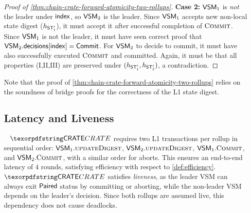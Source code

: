 \begin{proof}[Proof of \cref{thm:chain-crate-forward-atomicity-two-rollups}]
    \noindent\textbf{Case 2:} $\mathsf{VSM}_{1}$ is \emph{not} the leader under $\mathsf{index}$, so $\mathsf{VSM}_{2}$ is the leader. Since $\mathsf{VSM}_{1}$ accepts new non-local state digest ($h_{\mathsf{ST_{1}'}}$), it must accept it after successful completion of $\textproc{Commit}$. Since $\mathsf{VSM}_{1}$ is not the leader, it must have seen correct proof that $\mathsf{VSM}_{2}.\mathsf{decisions}[\mathsf{index}] = \mathsf{Commit}$. For $\mathsf{VSM}_{2}$ to decide to commit, it must have also successfully executed $\textproc{Commit}$ and committed. Again, it must be that all properties (I,II,III) are preserved under $(h_{\mathsf{ST_{1}'}}, h_{\mathsf{ST_{2}'}})$, a contradiction.  

\end{proof}

Note that the proof of \cref{thm:chain-crate-forward-atomicity-two-rollups} relies on the soundness of bridge proofs for the correctness of the L1 state digest.


\subsection{Latency and Liveness}~\label{sec:liveness-chain-crt}
$\pname$ requires two L1 transactions per rollup in sequential order: $\vsm{1}.\textproc{updateDigest}$, $\vsm{2}.\textproc{updateDigest}$, $\vsm{1}.\textproc{Commit}$, and $\vsm{2}.\textproc{Commit}$, with a similar order for aborts. This ensures an end-to-end latency of $4$ rounds, satisfying efficiency with respect to \cref{def:efficiency}. $\pname$ satisfies \emph{liveness}, as the leader VSM can always exit $\mathsf{Paired}$ status by committing or aborting, while the non-leader VSM depends on the leader’s decision. Since both rollups are assumed live, this dependency does not cause deadlocks.



































